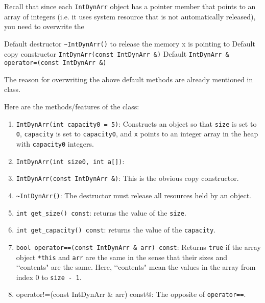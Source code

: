 Recall that since each \verb!IntDynArr! object has a pointer member that 
points to an array of integers (i.e. it uses system resource that is not 
automatically released), you need to overwrite the 
\begin{tightlist}
\li Default destructor \verb!~IntDynArr()! to release the memory x is 
pointing to
\li Default copy constructor \verb!IntDynArr(const IntDynArr &)!
\li Default \verb!IntDynArr & operator=(const IntDynArr &)!
\end{tightlist}
The reason for overwriting the above default methods are already 
mentioned in class.

Here are the methods/features of the class:
\begin{enumerate}
\item \verb!IntDynArr(int capacity0 = 5)!:
  Constructs an object so that 
  \verb!size! is set to \verb!0!,
  \verb!capacity! is set to \verb!capacity0!,
  and \verb!x! points to an 
  integer array in the heap with \verb!capacity0! integers.

\item \verb!IntDynArr(int size0, int a[])!:
  
\item \verb!IntDynArr(const IntDynArr &)!: This is the obvious copy 
constructor. 

\item \verb!~IntDynArr()!: The destructor must release all resources held by 
an object.

\item \verb!int get_size() const!: returns the value of the \verb!size!.
\item \verb!int get_capacity() const!: returns the value of the 
\verb!capacity!.

\item \verb!bool operator==(const IntDynArr & arr) const!: Returns \verb!true! if 
the array object \verb!*this! and \verb!arr! are the same in the sense that 
their sizes and \lq\lq contents" are the same. Here, \lq\lq contents" mean the 
values in the array from index 0 to \verb!size - 1!. 

\item \verb@bool operator!=(const IntDynArr & arr) const@: The opposite of 
\verb!operator==!.


\end{enumerate}
